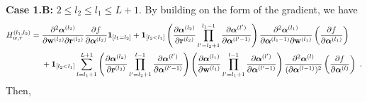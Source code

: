 {\bf Case 1.B:} $2 \leq l_2 \leq l_1 \leq L+1$. By building on the form of the gradient, we have 
\begin{align*}
H_{w,r}^{(l_1,l_2)} & = \frac{\partial^2 \boldsymbol{\alpha}^{(l_2)}}{\partial \mathbf{w}^{(l_2)} \partial \mathbf{r}^{(l_2)}} \frac{\partial f}{\partial \boldsymbol{\alpha}^{(l_2)}} \bm{1}_{[l_1 =l_2]} + \bm{1}_{[l_2 <l_1]} \left( \frac{\partial \boldsymbol{\alpha}^{(l_2)}}{\partial \mathbf{r}^{(l_2)}}  \prod_{l'=l_2+1}^{l_1-1} \frac{\partial \boldsymbol{\alpha}^{(l')}}{\partial \boldsymbol{\alpha}^{(l'-1)}} \right) \frac{\partial^2 \boldsymbol{\alpha}^{(l_1)}}{\partial \boldsymbol{\alpha}^{(l_1-1)} \partial \mathbf{w}^{(l_1)}} \left(\frac{\partial f}{\partial \boldsymbol{\alpha}^{(l_1)}} \right) \\
& ~~~~ + \bm{1}_{[l_2 <l_1]}\sum_{l=l_1+1}^{L+1} \left( \frac{\partial \boldsymbol{\alpha}^{(l_2)}}{\partial \mathbf{r}^{(l_2)}} \prod_{l'=l_2+1}^{l-1} \frac{\partial \boldsymbol{\alpha}^{(l')}}{\partial \boldsymbol{\alpha}^{(l'-1)}} \right)  \left( \frac{\partial \boldsymbol{\alpha}^{(l_1)}}{\partial \mathbf{w}^{(l_1)}} \prod_{l'=l_1+1}^{l-1} \frac{\partial \boldsymbol{\alpha}^{(l')}}{\partial \boldsymbol{\alpha}^{(l'-1)}} \right) \frac{\partial^2 \boldsymbol{\alpha}^{(l)}}{(\partial \boldsymbol{\alpha}^{(l-1)})^2}  \left(\frac{\partial f}{\partial \boldsymbol{\alpha}^{(l)}} \right) ~. 
\end{align*}
Then,
